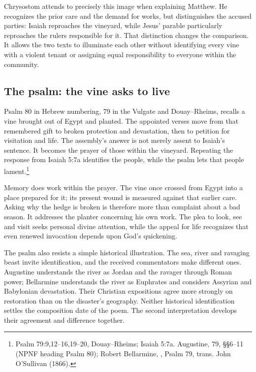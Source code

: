 Chrysostom attends to precisely this image when explaining Matthew. He recognizes the prior care and the demand for works, but distinguishes the accused parties: Isaiah reproaches the vineyard, while Jesus' parable particularly reproaches the rulers responsible for it. That distinction changes the comparison. It allows the two texts to illuminate each other without identifying every vine with a violent tenant or assigning equal responsibility to everyone within the community.

\subsection{The psalm: the vine asks to live}
Psalm 80 in Hebrew numbering, 79 in the Vulgate and Douay--Rheims, recalls a vine brought out of Egypt and planted. The appointed verses move from that remembered gift to broken protection and devastation, then to petition for visitation and life. The assembly's answer is not merely assent to Isaiah's sentence. It becomes the prayer of those within the vineyard. Repeating the response from Isaiah 5:7a identifies the people, while the psalm lets that people lament.\footnote{Psalm 79:9,12--16,19--20, Douay--Rheims; Isaiah 5:7a. Augustine,  79, §§6--11 (NPNF heading Psalm 80); Robert Bellarmine, , Psalm 79, trans. John O'Sullivan (1866).}

Memory does work within the prayer. The vine once crossed from Egypt into a place prepared for it; its present wound is measured against that earlier care. Asking why the hedge is broken is therefore more than complaint about a bad season. It addresses the planter concerning his own work. The plea to look, see and visit seeks personal divine attention, while the appeal for life recognizes that even renewed invocation depends upon God's quickening.

The psalm also resists a simple historical illustration. The sea, river and ravaging beast invite identification, and the received commentators make different ones. Augustine understands the river as Jordan and the ravager through Roman power; Bellarmine understands the river as Euphrates and considers Assyrian and Babylonian devastation. Their Christian expositions agree more strongly on restoration than on the disaster's geography. Neither historical identification settles the composition date of the poem. The second interpretation develops their agreement and difference together.


